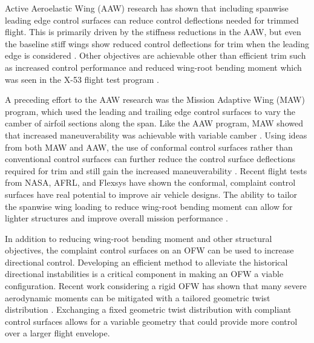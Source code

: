 Active Aeroelastic Wing (AAW) research has shown that including spanwise leading edge control surfaces can reduce control deflections needed for trimmed flight.
This is primarily driven by the stiffness reductions in the AAW, but even the baseline stiff wings show reduced control deflections for trim when the leading edge is considered \cite{AAW_multipleCS}.
Other objectives are achievable other than efficient trim such as increased control performance and reduced wing-root bending moment which was seen in the X-53 flight test program \cite{x53Summary, zink2001maneuver}.

A preceding effort to the AAW research was the Mission Adaptive Wing (MAW) program, which used the leading and trailing edge control surfaces to vary the camber of airfoil sections along the span.
Like the AAW program, MAW showed that increased maneuverability was achievable with variable camber \cite{MAW_flight}.
Using ideas from both MAW and AAW, the use of conformal control surfaces rather than conventional control surfaces can further reduce the control surface deflections required for trim and still gain the increased maneuverability \cite{FW_conformal}.
Recent flight tests from NASA, AFRL, and Flexsys have shown the conformal, complaint control surfaces have real potential to improve air vehicle designs.
The ability to tailor the spanwise wing loading to reduce wing-root bending moment can allow for lighter structures and improve overall mission performance \cite{flexsys_1}.

In addition to reducing wing-root bending moment and other structural objectives, the complaint control surfaces on an OFW can be used to increase directional control.
Developing an efficient method to alleviate the historical directional instabilities is a critical component in making an OFW a viable configuration.
Recent work considering a rigid OFW has shown that many severe aerodynamic moments can be mitigated with a tailored geometric twist distribution \cite{deslich2020}.
Exchanging a fixed geometric twist distribution with compliant control surfaces allows for a variable geometry that could provide more control over a larger flight envelope.


